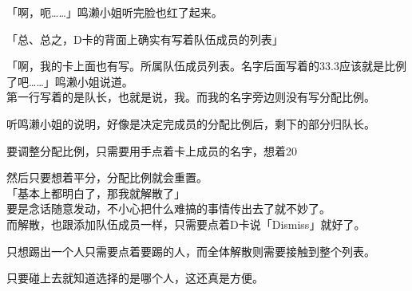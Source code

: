 「啊，呃……」鸣濑小姐听完脸也红了起来。

「总、总之，D卡的背面上确实有写着队伍成员的列表」

「啊，我的卡上面也有写。所属队伍成员列表。名字后面写着的33.3应该就是比例了吧……」鸣濑小姐说道。\\

第一行写着的是队长，也就是说，我。而我的名字旁边则没有写分配比例。

听鸣濑小姐的说明，好像是决定完成员的分配比例后，剩下的部分归队长。

要调整分配比例，只需要用手点着卡上成员的名字，想着20%

然后只要想着平分，分配比例就会重置。\\

「基本上都明白了，那我就解散了」\\

要是念话随意发动，不小心把什么难搞的事情传出去了就不妙了。\\

而解散，也跟添加队伍成员一样，只需要点着D卡说「Dismiss」就好了。

只想踢出一个人只需要点着要踢的人，而全体解散则需要接触到整个列表。

只要碰上去就知道选择的是哪个人，这还真是方便。\\

